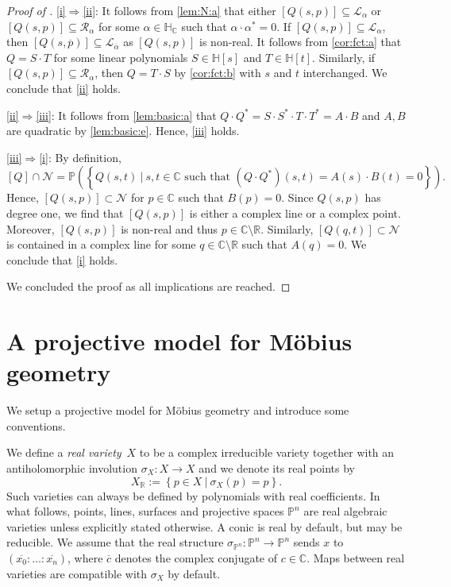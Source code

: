 \documentclass[11pt]{article}
\newcommand{\RL}[2]{\Cref{lem:#1}\ref{lem:#1:#2}}
\newcommand{\C}{\mathbb{C}}
\newcommand{\R}{\mathbb{R}}
\renewcommand{\H}{\mathbb{H}}
\renewcommand{\P}{\mathbb{P}}
\newcommand{\cN}{\mathcal{N}}
\newcommand{\cL}{\mathcal{L}}
\newcommand{\cR}{\mathcal{R}}
\newcommand{\op}{{\overline{p}}}
\newcommand{\oalpha}{{\overline{\alpha}}}
\newcommand{\HC}{\mathbb{H}_{\C}}
\renewcommand{\c}{\colon}
\newcommand{\set}[2]{\left\{#1 ~|~ #2\right\}}
\newcommand{\df}{\emph}
\newcommand{\st}{such that }
\begin{document}
\begin{proof}[Proof of ]
\ref{i}$\Rightarrow$\ref{ii}:
It follows from \RL{N}{a} that either $[Q(s,p)]\subseteq\cL_\alpha$
or $[Q(s,p)]\subseteq\cR_\alpha$ for some $\alpha\in\HC$ \st $\alpha\cdot\alpha^*=0$.
If $[Q(s,p)]\subseteq\cL_\alpha$, then $[Q(s,\op)]\subseteq\cL_\oalpha$
as $[Q(s,p)]$ is non-real.
It follows from \ref{cor:fct:a} that $Q=S\cdot T$ for some linear polynomials $S\in\H[s]$ and $T\in\H[t]$.
Similarly, if $[Q(s,p)]\subseteq\cR_\alpha$,
then $Q=T\cdot S$ by \ref{cor:fct:b} with $s$ and $t$ interchanged.
We conclude that \ref{ii} holds.

\ref{ii}$\Rightarrow$\ref{iii}:
It follows from \RL{basic}{a} that $Q\cdot Q^*=S\cdot S^*\cdot T\cdot T^*=A\cdot B$
and $A,B$ are quadratic by \RL{basic}{e}. Hence, \ref{iii} holds.

\ref{iii}$\Rightarrow$\ref{i}:
By definition,
\[
[Q]\cap\cN=\P(\set{Q(s,t)}{s,t\in\C \text{ \st } (Q\cdot Q^*)(s,t)=A(s)\cdot B(t)=0}).
\]
Hence, $[Q(s,p)]\subset\cN$ for $p\in\C$ \st $B(p)=0$.
Since $Q(s,p)$ has degree one, we find that $[Q(s,p)]$ is either
a complex line or a complex point.
Moreover, $[Q(s,p)]$ is non-real and thus $p\in\C\setminus\R$.
Similarly, $[Q(q,t)]\subset\cN$ is contained in a complex line
for some $q\in\C\setminus\R$ \st $A(q)=0$.
We conclude that \ref{i} holds.

We concluded the proof as all implications are reached.
\end{proof}


\section{A projective model for M\"obius geometry}
\label{sec:model}

We setup a projective model for M\"obius geometry
and introduce some conventions.

We define a \df{real variety}~$X$ to be a complex irreducible variety together with
an antiholomorphic involution $\sigma_X\c X\to X$
and we denote its real points by
\[
X_\R:=\set{p\in X}{\sigma_X(p)=p}.
\]
Such varieties can always be defined by polynomials with real coefficients.
In what follows,
points, lines, surfaces and projective spaces $\P^n$ are real algebraic varieties
unless explicitly stated otherwise.
A conic is real by default, but may be reducible.
We assume that the real structure $\sigma_{\P^n}\c\P^n\to\P^n$ sends $x$
to $(\overline{x_0}:\ldots:\overline{x_n})$, where $\overline{c}$ denotes the complex conjugate of $c\in \C$.
Maps between real varieties are compatible with $\sigma_X$ by default.
\end{document}
